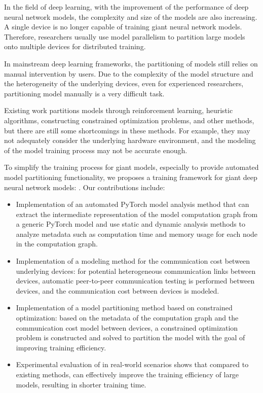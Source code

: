 In the field of deep learning, with the improvement of the performance of deep neural network models, the complexity and size of the models are also increasing. A single device is no longer capable of training giant neural network models. Therefore, researchers usually use model parallelism to partition large models onto multiple devices for distributed training.

In mainstream deep learning frameworks, the partitioning of models still relies on manual intervention by users. Due to the complexity of the model structure and the heterogeneity of the underlying devices, even for experienced researchers, partitioning model manually is a very difficult task.

Existing work partitions models through reinforcement learning, heuristic algorithms, constructing constrained optimization problems, and other methods, but there are still some shortcomings in these methods. For example, they may not adequately consider the underlying hardware environment, and the modeling of the model training process may not be accurate enough.

To simplify the training process for giant models, especially to provide automated model partitioning functionality, we proposes a training framework for giant deep neural network models: \sys{}. Our contributions include:

\begin{itemize}
\item Implementation of an automated PyTorch model analysis method that can extract the intermediate representation of the model computation graph from a generic PyTorch model and use static and dynamic analysis methods to analyze metadata such as computation time and memory usage for each node in the computation graph.
\item Implementation of a modeling method for the communication cost between underlying devices: for potential heterogeneous communication links between devices, automatic peer-to-peer communication testing is performed between devices, and the communication cost between devices is modeled.
\item Implementation of a model partitioning method based on constrained optimization: based on the metadata of the computation graph and the communication cost model between devices, a constrained optimization problem is constructed and solved to partition the model with the goal of improving training efficiency.
\item Experimental evaluation of \sys{} in real-world scenarios shows that compared to existing methods, \sys{} can effectively improve the training efficiency of large models, resulting in shorter training time.
\end{itemize}
